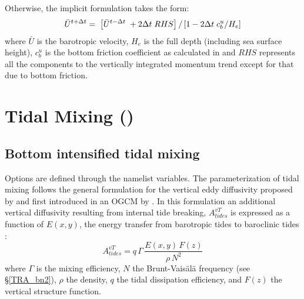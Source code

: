 {Otherwise, the implicit formulation takes the form:
\begin{equation} \label{Eq_zdfbfr_implicitts}
 \bar{U}^{t+ \Delta t} = \; \left [ \bar{U}^{t-\Delta t}\; + 2 \Delta t\;RHS \right ] / \left [ 1 - 2 \Delta t \;c_b^{u} / H_e \right ]  
\end{equation}
where $\bar U$ is the barotropic velocity, $H_e$ is the full depth (including sea surface height), 
$c_b^u$ is the bottom friction coefficient as calculated in  and $RHS$ represents 
all the components to the vertically integrated momentum trend except for that due to bottom friction.




\section{Tidal Mixing ()}
\label{ZDF_tmx}



\subsection{Bottom intensified tidal mixing}
\label{ZDF_tmx_bottom}

Options are defined through the   namelist variables.
The parameterization of tidal mixing follows the general formulation for 
the vertical eddy diffusivity proposed by \citet{St_Laurent_al_GRL02} and 
first introduced in an OGCM by \citep{Simmons_al_OM04}. 
In this formulation an additional vertical diffusivity resulting from internal tide breaking, 
$A^{vT}_{tides}$ is expressed as a function of $E(x,y)$, the energy transfer from barotropic 
tides to baroclinic tides : 
\begin{equation} \label{Eq_Ktides}
A^{vT}_{tides} =  q \,\Gamma \,\frac{ E(x,y) \, F(z) }{ \rho \, N^2 }
\end{equation}
where $\Gamma$ is the mixing efficiency, $N$ the Brunt-Vais\"{a}l\"{a} frequency 
(see \S\ref{TRA_bn2}), $\rho$ the density, $q$ the tidal dissipation efficiency, 
and $F(z)$ the vertical structure function. 

}
